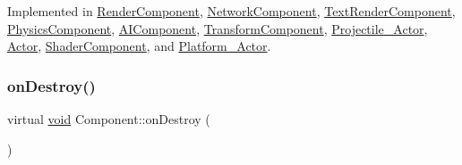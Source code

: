 Implemented in \hyperlink{classRenderComponent_a5ecc72f2a9249c4df22365dbe7ca49b0}{Render\+Component}, \hyperlink{classNetworkComponent_afe34eefd95bb82a8496c856a19e0f153}{Network\+Component}, \hyperlink{classTextRenderComponent_aafaf33608a83d1ff4af66ef53ba81b29}{Text\+Render\+Component}, \hyperlink{classPhysicsComponent_ad797a2708cfc3c0e88a44341121f594d}{Physics\+Component}, \hyperlink{classAIComponent_a1f7e2f748183cbcba9e3f351025b862c}{A\+I\+Component}, \hyperlink{classTransformComponent_aef9e192f10ac612d6b146136603b3293}{Transform\+Component}, \hyperlink{classProjectile__Actor_a98e2e2198cd164c35318c04f96e6a3ac}{Projectile\+\_\+\+Actor}, \hyperlink{classActor_a56a241c949adf52cedceb45a7102ea1a}{Actor}, \hyperlink{classShaderComponent_a0c42362c7ba178050551e7451b49abe5}{Shader\+Component}, and \hyperlink{classPlatform__Actor_ab902e2540f1d3127dedff632841b4921}{Platform\+\_\+\+Actor}.

\mbox{\label{classComponent_a2b198f27162a6caf63917e304295f892}} 
\subsubsection{\texorpdfstring{on\+Destroy()}{onDestroy()}\hspace{0.1cm}{\footnotesize\ttfamily [1/2]}}
{\footnotesize\ttfamily virtual \hyperlink{imgui__impl__opengl3__loader_8h_ac668e7cffd9e2e9cfee428b9b2f34fa7}{void} Component\+::on\+Destroy (\begin{DoxyParamCaption}{ }\end{DoxyParamCaption})\hspace{0.3cm}{\ttfamily [pure virtual]}}




